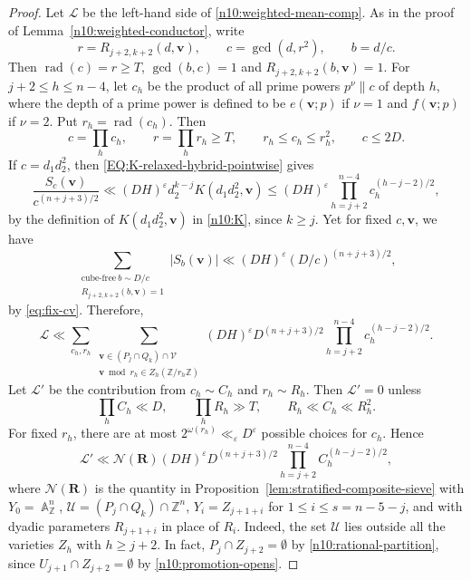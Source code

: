 \documentclass[a4paper,11pt, twoside,reqno]{amsart}
\theoremstyle{plain}
\theoremstyle{definition}
\theoremstyle{remark}
\newcommand{\bfv}{\bm{v}}
\newcommand{\ZZ}{\mathbb{Z}}
\DeclareMathOperator{\A}{\mathbb{A}}
\newcommand{\ve}{\varepsilon}
\renewcommand{\le}{\leqslant}
\renewcommand{\ge}{\geqslant}
\newcommand{\rad}{\operatorname{rad}}
\numberwithin{equation}{section}
\begin{document}
\begin{proof}
Let $\mathcal L$ be the left-hand side of \eqref{n10:weighted-mean-comp}.
As in the proof of Lemma~\ref{n10:weighted-conductor}, write
\[
r=R_{j+2,k+2}(d,\bfv),\qquad c=\gcd(d,r^2),\qquad b=d/c.
\]
Then $\rad(c)=r\ge T$, $\gcd(b,c)=1$ and
$R_{j+2,k+2}(b,\bfv)=1$.
For $j+2\le h\le n-4$, let $c_h$ be the product of all prime powers
$p^\nu\parallel c$ of depth $h$, where the depth of a prime power is defined to be
$e(\bfv;p)$ if $\nu=1$
and $f(\bfv;p)$ if $\nu=2$.
Put $r_h=\rad(c_h)$.
Then
\[
c=\prod_hc_h,\qquad r=\prod_hr_h\ge T,\qquad
r_h\le c_h\le r_h^2,\qquad c\le2D.
\]
If $c=d_1d_2^2$, then \eqref{EQ:K-relaxed-hybrid-pointwise} gives
$$\frac{S_c(\bfv)}{c^{(n+j+3)/2}}
\ll (DH)^\ve d_2^{k-j} K(d_1d_2^2,\bfv)
\le (DH)^\ve \prod_{h=j+2}^{n-4}c_h^{(h-j-2)/2},$$
by the definition of $K(d_1d_2^2,\bfv)$ in \eqref{n10:K},
since $k\ge j$.
Yet for fixed $c,\bfv$,
we have
$$\sum_{\substack{\mathrm{cube\text{-}free}\ b\sim D/c \\ R_{j+2,k+2}(b,\bfv)=1}}
|S_b(\bfv)| \ll (DH)^\ve (D/c)^{(n+j+3)/2},
$$
by \eqref{eq:fix-cv}.
Therefore,
\begin{equation*}
\mathcal L
\ll \sum_{c_h,r_h}
\sum_{\substack{
\bfv\in(P_j\cap Q_k)\cap\mathcal V\\
\bfv\bmod{r_h} \in Z_h(\ZZ/r_h\ZZ)}}
(DH)^\ve D^{(n+j+3)/2} \prod_{h=j+2}^{n-4}c_h^{(h-j-2)/2}.
\end{equation*}
Let $\mathcal L'$ be the contribution from $c_h\sim C_h$ and $r_h\sim R_h$.
Then $\mathcal L' = 0$ unless
\[
\prod_h C_h\ll D,\qquad
\prod_h R_h\gg T,\qquad R_h\ll C_h\ll R_h^2.
\]
For fixed $r_h$, there are at most
$2^{\omega(r_h)}\ll_\ve D^\ve$ possible choices for $c_h$.
Hence
\begin{equation*}
\mathcal L'
\ll \mathcal N(\bm R)
(DH)^\ve D^{(n+j+3)/2} \prod_{h=j+2}^{n-4} C_h^{(h-j-2)/2},
\end{equation*}
where $\mathcal N(\bm R)$ is the quantity in
Proposition~\ref{lem:stratified-composite-sieve}
with $Y_0=\A_\ZZ^n$,
$\mathcal U=(P_j\cap Q_k)\cap\ZZ^n$,
$Y_i = Z_{j+1+i}$ for $1\le i\le s=n-5-j$,
and with dyadic parameters $R_{j+1+i}$ in place of $R_i$.
Indeed, the set $\mathcal U$
lies outside all the varieties $Z_h$
with $h\ge j+2$.
In fact, $P_j \cap Z_{j+2} = \emptyset$ by \eqref{n10:rational-partition},
since $U_{j+1} \cap Z_{j+2} = \emptyset$ by \eqref{n10:promotion-opens}.


\end{proof}
\end{document}
